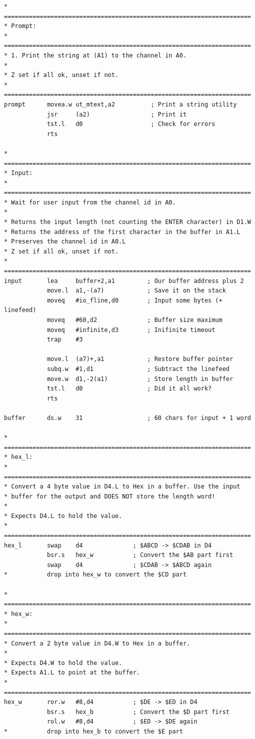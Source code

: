 \begin{lstlisting}[firstnumber=last,caption={Linked Lists - Wrapper - Part 2},label={LinkedListsWrapperPart2}]
* =====================================================================
* Prompt:
* =====================================================================
* 1. Print the string at (A1) to the channel in A0.
*
* Z set if all ok, unset if not.
* =====================================================================
prompt      movea.w ut_mtext,a2          ; Print a string utility
            jsr     (a2)                 ; Print it
            tst.l   d0                   ; Check for errors
            rts

* =====================================================================
* Input:
* =====================================================================
* Wait for user input from the channel id in A0.
*
* Returns the input length (not counting the ENTER character) in D1.W
* Returns the address of the first character in the buffer in A1.L
* Preserves the channel id in A0.L
* Z set if all ok, unset if not.
* =====================================================================
input       lea     buffer+2,a1         ; Our buffer address plus 2
            move.l  a1,-(a7)            ; Save it on the stack
            moveq   #io_fline,d0        ; Input some bytes (+ linefeed)
            moveq   #60,d2              ; Buffer size maximum
            moveq   #infinite,d3        ; Inifinite timeout
            trap    #3

            move.l  (a7)+,a1            ; Restore buffer pointer
            subq.w  #1,d1               ; Subtract the linefeed
            move.w  d1,-2(a1)           ; Store length in buffer
            tst.l   d0                  ; Did it all work?
            rts

buffer      ds.w    31                  ; 60 chars for input + 1 word

* =====================================================================
* hex_l:
* =====================================================================
* Convert a 4 byte value in D4.L to Hex in a buffer. Use the input
* buffer for the output and DOES NOT store the length word!
*
* Expects D4.L to hold the value.
* =====================================================================
hex_l       swap    d4              ; $ABCD -> $CDAB in D4
            bsr.s   hex_w           ; Convert the $AB part first
            swap    d4              ; $CDAB -> $ABCD again
*           drop into hex_w to convert the $CD part

* =====================================================================
* hex_w:
* =====================================================================
* Convert a 2 byte value in D4.W to Hex in a buffer.
*
* Expects D4.W to hold the value.
* Expects A1.L to point at the buffer.
* =====================================================================
hex_w       ror.w   #8,d4           ; $DE -> $ED in D4
            bsr.s   hex_b           ; Convert the $D part first
            rol.w   #8,d4           ; $ED -> $DE again
*           drop into hex_b to convert the $E part


\end{lstlisting}
